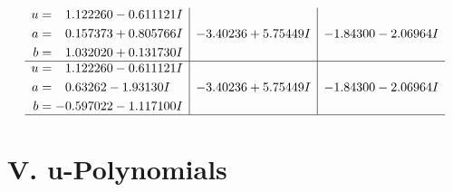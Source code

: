 \documentclass[1p]{elsarticle_modified}
\theoremstyle{definition}
\begin{document}
$$\begin{array}{c|c|c}
\begin{aligned}
u &= \phantom{-}1.122260 - 0.611121 I \\
a &= \phantom{-}0.157373 + 0.805766 I \\
b &= \phantom{-}1.032020 + 0.131730 I\end{aligned}
 & -3.40236 + 5.75449 I & -1.84300 - 2.06964 I \\ \hline\begin{aligned}
u &= \phantom{-}1.122260 - 0.611121 I \\
a &= \phantom{-}0.63262 - 1.93130 I \\
b &= -0.597022 - 1.117100 I\end{aligned}
 & -3.40236 + 5.75449 I & -1.84300 - 2.06964 I\\
 \hline 
 \end{array}$$\newpage
\newpage\renewcommand{\arraystretch}{1}
\centering \section*{ V. u-Polynomials}
\end{document}
